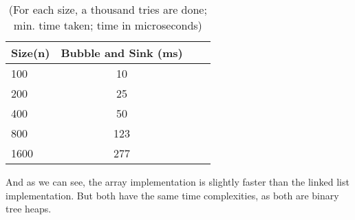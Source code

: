 \documentclass[a4paper,11pt]{article}
\begin{document}
\begin{table}[h]
\begin{center}
\begin{tabular}{l|c|c|c}
\textbf{Size(n)} & \textbf{ Bubble and Sink (ms)}\\
\hline
  100     &  10\\
  200      &  25\\
  400      &    50\\
  800      &  123\\
  1600      &  277\\
\end{tabular}
\caption{(For each size, a thousand tries are done; min. time taken; time in microseconds)}
\label{tab:table1}
\end{center}
\end{table}

And as we can see, the array implementation is slightly faster than the linked list implementation. But both have the same time complexities, as both are binary tree heaps.
\end{document}
